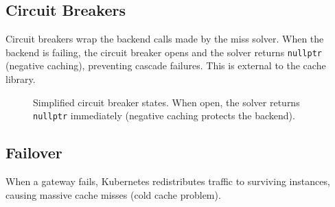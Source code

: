 \documentclass[11pt,a4paper]{article}
\begin{document}
\subsection{Circuit Breakers}

Circuit breakers wrap the backend calls made by the miss solver.  When
the backend is failing, the circuit breaker opens and the solver returns
\texttt{nullptr} (negative caching), preventing cascade failures.  This
is external to the cache library.

\begin{figure}[htbp]
\centering
{}
\caption{Simplified circuit breaker states.  When open, the solver
         returns \texttt{nullptr} immediately (negative caching protects
         the backend).}
\label{fig:circuit-breaker}
\end{figure}

\subsection{Failover}

When a gateway fails, Kubernetes redistributes traffic to surviving
instances, causing massive cache misses (cold cache problem).
\end{document}
